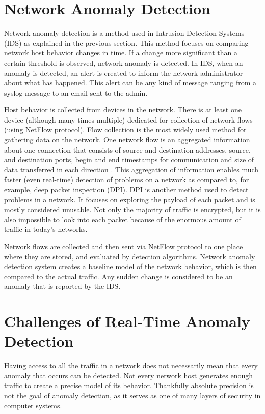 \documentclass[thesis=B,english]{FITthesis}[2012/10/20]
\begin{document}
\section{Network Anomaly Detection}\label{sec:nbad}
Network anomaly detection is a method used in Intrusion Detection Systems (IDS) as explained in the previous section.
This method focuses on comparing network host behavior changes in time.
If a change more significant than a certain threshold is observed, network anomaly is detected.
In IDS, when an anomaly is detected, an alert is created to inform the network administrator about what has happened.
This alert can be any kind of message ranging from a syslog message to an email sent to the admin.

Host behavior is collected from devices in the network.
There is at least one device (although many times multiple) dedicated for collection of network flows (using NetFlow protocol).
Flow collection is the most widely used method for gathering data on the network.
One network flow is an aggregated information about one connection that consists of source and destination addresses, source, and destination ports, begin and end timestamps for communication and size of data transferred in each direction \cite{rfc2722}.
This aggregation of information enables much faster (even real-time) detection of problems on a network as compared to, for example, deep packet inspection (DPI).
DPI is another method used to detect problems in a network.
It focuses on exploring the payload of each packet and is mostly considered unusable.
Not only the majority of traffic is encrypted, but it is also impossible to look into each packet because of the enormous amount of traffic in today's networks.

Network flows are collected and then sent via NetFlow protocol to one place where they are stored, and evaluated by detection algorithms.
Network anomaly detection system creates a baseline model of the network behavior, which is then compared to the actual traffic.
Any sudden change is considered to be an anomaly that is reported by the IDS.

\section{Challenges of Real-Time Anomaly Detection}\label{sec:challenges} 
Having access to all the traffic in a network does not necessarily mean that every anomaly that occurs can be detected.
Not every network host generates enough traffic to create a precise model of its behavior.
Thankfully absolute precision is not the goal of anomaly detection, as it serves as one of many layers of security in computer systems.
\end{document}
